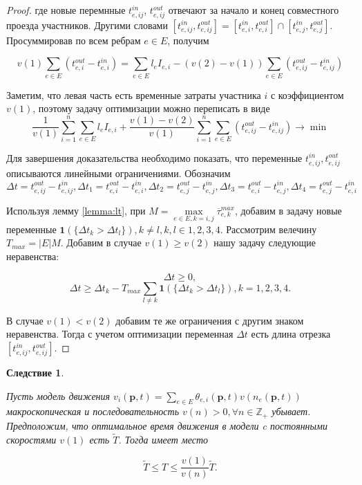\documentclass[12pt, a4paper]{article}
\DeclareMathOperator*{\minn}{min}
\newtheorem{corollary}{Следствие}[section]
\begin{document}
\begin{proof}
	где новые перемнные $t_{e, ij}^{in}$, $t_{e, ij}^{out}$ отвечают за начало и конец совместного проезда участников. Другими словами $[t_{e, ij}^{in}, t_{e, ij}^{out}] = [t_{e, i}^{in}, t_{e, i}^{out}] \cap [t_{e, j}^{in}, t_{e, j}^{out}]$. Просуммировав по всем ребрам $e \in E$, получим
	
	$$v(1) \sum \limits _{e \in E} (t_{e, i}^{out} - t_{e, i}^{in}) = \sum \limits _{e \in E} l_e I_{e, i} - (v(2) - v(1)) \sum \limits _{e \in E} (t_{e, ij}^{out} - t_{e, ij}^{in})$$
	
	Заметим, что левая часть есть временные затраты участника $i$ с коэффициентом $v(1)$, поэтому задачу оптимизации можно переписать в виде
	$$ \frac{1}{v (1)} \sum\limits_{i = 1}^n \sum \limits _{e \in E} l_e I_{e, i} + \frac{v(1) - v(2)}{v (1)}  \sum\limits_{i = 1}^n \sum \limits _{e \in E} (t_{e, ij}^{out} - t_{e, ij}^{in}) \rightarrow \minn $$
	
	Для завершения доказательства необходимо показать, что переменные $t_{e, ij}^{in}, t_{e, ij}^{out}$ описываются линейными ограничениями. Обозначим $\Delta t = t_{e, ij}^{out} - t_{e, ij}^{in}, \Delta t_1 =  t_{e, i}^{out} - t_{e, i}^{in}, \Delta t_2 =  t_{e, j}^{out} - t_{e, j}^{in}, \Delta t_3 =  t_{e, i}^{out} - t_{e, j}^{in}, \Delta t_4 =  t_{e, j}^{out} - t_{e, i}^{in}$
	
	Используя лемму \ref{lemma:lt}, при $M = \max\limits_{e \in E, k = i, j} \overline{\tau}_{e, k}^{max}$, добавим в задачу новые переменные $\textbf{1} (\{ \Delta t_k > \Delta t_l\}), k \ne l, k, l \in {1, 2, 3, 4}$. Рассмотрим велечину $T_{max} = |E|M$. Добавим в случае $v(1) \ge v(2)$ нашу задачу следующие неравенства: 
	
	$$\Delta t \ge 0, $$
	$$\Delta t \ge \Delta t_k - T_{max} \sum \limits_{l \ne k} {\textbf{1} (\{ \Delta t_k > \Delta t_l\})}, k = 1, 2, 3, 4.$$
	
	В случае $v(1) < v(2)$ добавим те же ограничения с другим знаком неравенства. Тогда с учетом оптимизации переменная $\Delta t$ есть длина отрезка $[t_{e, ij}^{in}, t_{e, ij}^{out}]$. 
	
\end{proof}

\begin{corollary}
	\label{corollary:rel}

	Пусть модель движения $ v_i(\textbf{p}, t) = \sum \limits _{e \in E} \theta_{e, i} (\textbf{p}, t) v (n_e (\textbf{p}, t))$ макроскопическая и последовательность $v(n) > 0, \forall n \in \mathbb{Z}_+$ убывает. Предположим, что оптимальное время движения в модели c постоянными скоростями $v(1)$ есть $\widetilde{T}$. Тогда имеет место

	$$ \widetilde{T} \le T \le \frac {v(1)}{v(n)} \widetilde{T}.$$
	
\end{corollary}
\end{document}
